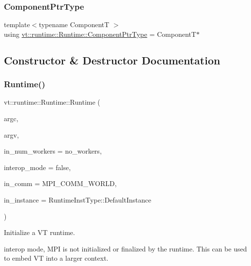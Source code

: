 \subsubsection{\texorpdfstring{Component\+Ptr\+Type}{ComponentPtrType}}
{\footnotesize\ttfamily template$<$typename ComponentT $>$ \\
using \hyperlink{structvt_1_1runtime_1_1_runtime_a0893bf0a8c03b898e8ab66b52cec80ad}{vt\+::runtime\+::\+Runtime\+::\+Component\+Ptr\+Type} =  ComponentT$\ast$}



\subsection{Constructor \& Destructor Documentation}
\mbox{\label{structvt_1_1runtime_1_1_runtime_abc553df92056d67d5e500047a460f8a0}} 
\subsubsection{\texorpdfstring{Runtime()}{Runtime()}\hspace{0.1cm}{\footnotesize\ttfamily [1/3]}}
{\footnotesize\ttfamily vt\+::runtime\+::\+Runtime\+::\+Runtime (\begin{DoxyParamCaption}\item[{int \&}]{argc,  }\item[{char $\ast$$\ast$\&}]{argv,  }\item[{\hyperlink{namespacevt_aa93398ea48f2cb6c188512250f7cc248}{Worker\+Count\+Type}}]{in\+\_\+num\+\_\+workers = {\ttfamily no\+\_\+workers},  }\item[{bool const}]{interop\+\_\+mode = {\ttfamily false},  }\item[{M\+P\+I\+\_\+\+Comm}]{in\+\_\+comm = {\ttfamily MPI\+\_\+COMM\+\_\+WORLD},  }\item[{\hyperlink{namespacevt_1_1runtime_afca910c1b38b3975f7c1da8001a77d58}{Runtime\+Inst\+Type} const}]{in\+\_\+instance = {\ttfamily RuntimeInstType\+:\+:DefaultInstance} }\end{DoxyParamCaption})}



Initialize a VT runtime. 

interop mode, M\+PI is not initialized or finalized by the runtime. This can be used to embed VT into a larger context.

